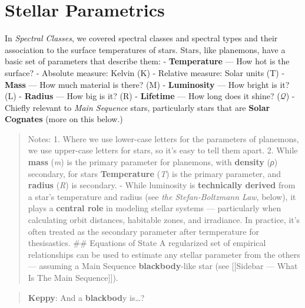 \documentclass[
  letterpaper,
]{book}
\begin{document}
\chapter{Stellar Parametrics}\label{stellar-parametrics}

In \emph{Spectral Classes}, we covered spectral classes and spectral
types and their association to the surface temperatures of stars. Stars,
like planemons, have a basic set of parameters that describe them: -
\textbf{Temperature} --- How hot is the surface? - Absolute measure:
Kelvin (K) - Relative measure: Solar units (T) - \textbf{Mass} --- How
much material is there? (M) - \textbf{Luminosity} --- How bright is it?
(L) - \textbf{Radius} --- How big is it? (R) - \textbf{Lifetime} --- How
long does it shine? (\(\mathcal{Q}\)) - Chiefly relevant to \emph{Main
Sequence} stars, particularly stars that are \textbf{Solar Cognates}
(more on this below.)

\begin{quote}
Notes: 1. Where we use lower-case letters for the parameters of
planemons, we use upper-case letters for stars, so it's easy to tell
them apart. 2. While \textbf{mass} (\emph{m}) is the primary parameter
for planemons, with \textbf{density} (\emph{ρ}) secondary, for stars
\textbf{Temperature} (\emph{T}) is the primary parameter, and
\textbf{radius} (\emph{R}) is secondary. - While luminosity is
\textbf{technically derived} from a star's temperature and radius (see
\emph{the Stefan-Boltzmann Law}, below), it plays a \textbf{central
role} in modeling stellar systems --- particularly when calculating
orbit distances, habitable zones, and irradiance. In practice, it's
often treated as the secondary parameter after termperature for
thesisastics. \#\# Equations of State A regularized set of empirical
relationships can be used to estimate any stellar parameter from the
others --- assuming a Main Sequence \textbf{blackbody}-like star (see
{[}{[}Sidebar --- What Is The Main Sequence{]}{]}).
\end{quote}

\begin{quote}
\textbf{Keppy}: And a \textbf{blackbod}y is\ldots?
\end{quote}
\end{document}
